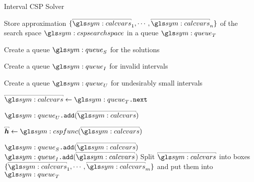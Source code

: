 				\begin{algorithm}[ht]
					\caption{Interval CSP Solver}\label{alg:interval_csp_solver}
					\begin{algorithmic}[1]

							\State{} Store approximation
								$\{{\interval{\calcvars}}_1, \cdots,
								{\interval{\calcvars}}_n\}$
								of the search space $\cspsearchspace$ in a queue
								$\queue_T$

							\State{} Create a queue $\queue_S$ for the solutions

							\State{} Create a queue $\queue_I$ for invalid
							intervals

							\State{} Create a queue $\queue_U$ for undesirably
							small intervals


								\State{} $\interval{\calcvars} \gets \queue_T\code{.next}$

								\If{$\diam(\interval{\calcvars}) < \threshold$}

									\State{} $\queue_U\code{.add}(\interval{\calcvars})$

								\Else{}
									\State{} $\interval{\vec{h}} \gets \cspfunc(\interval{\calcvars}) $

										\State{} $\queue_S\code{.add}(\interval{\calcvars})$
										\State{} $\queue_I\code{.add}(\interval{\calcvars}$)
									\Else{}
										\State{} Split $\interval{\calcvars}$ into boxes
										\(
											\{
												{\interval{\calcvars}}_1,
												\cdots,
												{\interval{\calcvars}}_m
											\}
										\) and put them into $\queue_T$
									\EndIf{}
								\EndIf{}
							\EndWhile{}
						\EndProcedure{}
					\end{algorithmic}
				\end{algorithm}

%
%
%
